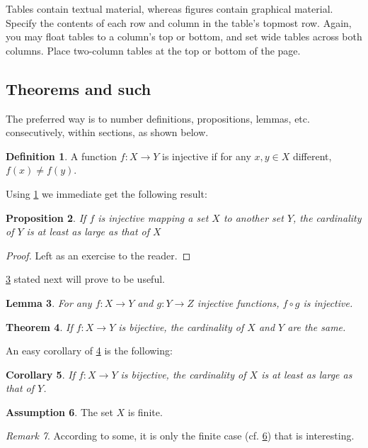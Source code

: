 \documentclass[nohyperref]{article}
\theoremstyle{plain}
\newtheorem{theorem}{Theorem}[section]
\newtheorem{proposition}[theorem]{Proposition}
\newtheorem{lemma}[theorem]{Lemma}
\newtheorem{corollary}[theorem]{Corollary}
\theoremstyle{definition}
\newtheorem{definition}[theorem]{Definition}
\newtheorem{assumption}[theorem]{Assumption}
\theoremstyle{remark}
\newtheorem{remark}[theorem]{Remark}
\begin{document}
Tables contain textual material, whereas figures contain graphical material.
Specify the contents of each row and column in the table's topmost
row. Again, you may float tables to a column's top or bottom, and set
wide tables across both columns. Place two-column tables at the
top or bottom of the page.

\subsection{Theorems and such}
The preferred way is to number definitions, propositions, lemmas, etc. consecutively, within sections, as shown below.
\begin{definition}
\label{def:inj}
A function $f:X \to Y$ is injective if for any $x,y\in X$ different, $f(x)\ne f(y)$.
\end{definition}
Using \cref{def:inj} we immediate get the following result:
\begin{proposition}
If $f$ is injective mapping a set $X$ to another set $Y$, 
the cardinality of $Y$ is at least as large as that of $X$
\end{proposition}
\begin{proof} 
Left as an exercise to the reader. 
\end{proof}
\cref{lem:usefullemma} stated next will prove to be useful.
\begin{lemma}
\label{lem:usefullemma}
For any $f:X \to Y$ and $g:Y\to Z$ injective functions, $f \circ g$ is injective.
\end{lemma}
\begin{theorem}
\label{thm:bigtheorem}
If $f:X\to Y$ is bijective, the cardinality of $X$ and $Y$ are the same.
\end{theorem}
An easy corollary of \cref{thm:bigtheorem} is the following:
\begin{corollary}
If $f:X\to Y$ is bijective, 
the cardinality of $X$ is at least as large as that of $Y$.
\end{corollary}
\begin{assumption}
The set $X$ is finite.
\label{ass:xfinite}
\end{assumption}
\begin{remark}
According to some, it is only the finite case (cf. \cref{ass:xfinite}) that is interesting.
\end{remark}






\newpage
\appendix
\onecolumn
\end{document}
